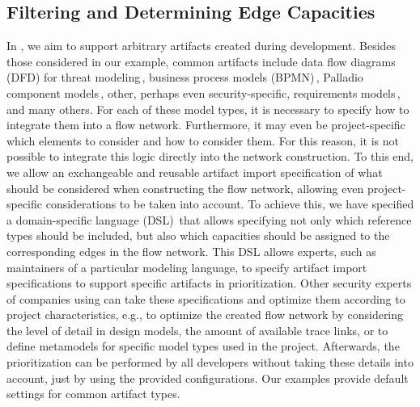 \subsection{Filtering and Determining Edge Capacities}\label{edgeCap}
\label{sec:dsl}
%
\noindent
In \appr{}, we aim to support arbitrary artifacts created during development.
Besides those considered in our example, common artifacts include data flow diagrams (DFD) for threat modeling\,\cite{Shostack2008,TUMA2018275}, business process models (BPMN)\,\cite{white2008bpmn}, Palladio component models\,\cite{reussner2011palladio}, other, perhaps even security-specific, requirements models\,\cite{8004340}, and many others.
For each of these model types, it is necessary to specify how to integrate them into a flow network.
Furthermore, it may even be project-specific which elements to consider and how to consider them.
For this reason, it is not possible to integrate this logic directly into the network construction.
To this end, we allow an exchangeable and reusable artifact import specification of what should be considered when constructing the flow network, allowing even project-specific considerations to be taken into account.
To achieve this, we have specified a domain-specific language (DSL)\,\cite{fowler2010domain,dsl} that allows specifying not only which reference types should be included, but also which capacities should be assigned to the corresponding edges in the flow network.
This DSL allows experts, such as maintainers of a particular modeling language, to specify artifact import specifications to support specific artifacts in prioritization.
Other security experts of companies using \appr{} can take these specifications and optimize them according to project characteristics, e.g., to optimize the created flow network by considering the level of detail in design models, the amount of available trace links, or to define metamodels for specific model types used in the project.
Afterwards, the prioritization can be performed by all developers without taking these details into account, just by using the provided configurations.
Our examples provide default settings for common artifact types.

